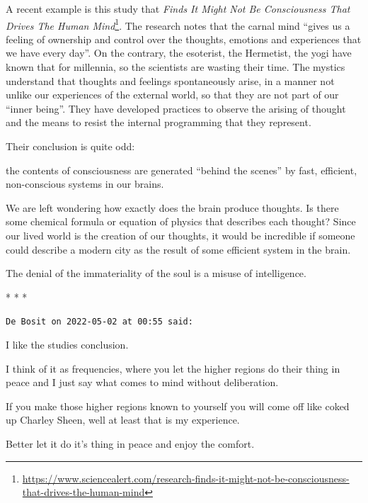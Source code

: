 A recent example is this study that \textit{Finds It Might Not Be Consciousness That Drives The Human Mind}\footnote{\url{https://www.sciencealert.com/research-finds-it-might-not-be-consciousness-that-drives-the-human-mind}}. The research notes that the carnal mind ``gives us a feeling of ownership and control over the thoughts, emotions and experiences that we have every day''. On the contrary, the esoterist, the Hermetist, the yogi have known that for millennia, so the scientists are wasting their time. The mystics understand that thoughts and feelings spontaneously arise, in a manner not unlike our experiences of the external world, so that they are not part of our ``inner being''. They have developed practices to observe the arising of thought and the means to resist the internal programming that they represent.

Their conclusion is quite odd:

\begin{quotex}
the contents of consciousness are generated ``behind the scenes'' by fast, efficient, non-conscious systems in our brains.
\end{quotex}


We are left wondering how exactly does the brain produce thoughts. Is there some chemical formula or equation of physics that describes each thought? Since our lived world is the creation of our thoughts, it would be incredible if someone could describe a modern city as the result of some efficient system in the brain.

The denial of the immateriality of the soul is a misuse of intelligence.



\begin{center}* * *\end{center}

\begin{footnotesize}
\begin{sffamily}
\texttt{De Bosit on 2022-05-02 at 00:55 said:}

I like the studies conclusion.

I think of it as frequencies, where you let the higher regions do their thing in peace and I just say what comes to mind without deliberation.

If you make those higher regions known to yourself you will come off like coked up Charley Sheen, well at least that is my experience.

Better let it do it's thing in peace and enjoy the comfort.

\hfill


\end{sffamily}
\end{footnotesize}

